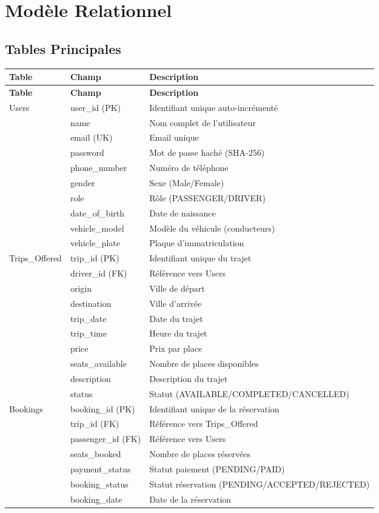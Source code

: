 \documentclass[12pt,a4paper]{report}
\begin{document}
\chapter{Modèle Relationnel}

\section{Tables Principales}

\begin{longtable}{|l|l|p{6cm}|}
\hline
\textbf{Table} & \textbf{Champ} & \textbf{Description} \\
\hline
\endfirsthead
\hline
\textbf{Table} & \textbf{Champ} & \textbf{Description} \\
\hline
\endhead

Users & user\_id (PK) & Identifiant unique auto-incrémenté \\
 & name & Nom complet de l'utilisateur \\
 & email (UK) & Email unique \\
 & password & Mot de passe haché (SHA-256) \\
 & phone\_number & Numéro de téléphone \\
 & gender & Sexe (Male/Female) \\
 & role & Rôle (PASSENGER/DRIVER) \\
 & date\_of\_birth & Date de naissance \\
 & vehicle\_model & Modèle du véhicule (conducteurs) \\
 & vehicle\_plate & Plaque d'immatriculation \\
\hline

Trips\_Offered & trip\_id (PK) & Identifiant unique du trajet \\
 & driver\_id (FK) & Référence vers Users \\
 & origin & Ville de départ \\
 & destination & Ville d'arrivée \\
 & trip\_date & Date du trajet \\
 & trip\_time & Heure du trajet \\
 & price & Prix par place \\
 & seats\_available & Nombre de places disponibles \\
 & description & Description du trajet \\
 & status & Statut (AVAILABLE/COMPLETED/CANCELLED) \\
\hline

Bookings & booking\_id (PK) & Identifiant unique de la réservation \\
 & trip\_id (FK) & Référence vers Trips\_Offered \\
 & passenger\_id (FK) & Référence vers Users \\
 & seats\_booked & Nombre de places réservées \\
 & payment\_status & Statut paiement (PENDING/PAID) \\
 & booking\_status & Statut réservation (PENDING/ACCEPTED/REJECTED) \\
 & booking\_date & Date de la réservation \\
\hline


\end{longtable}
\end{document}

